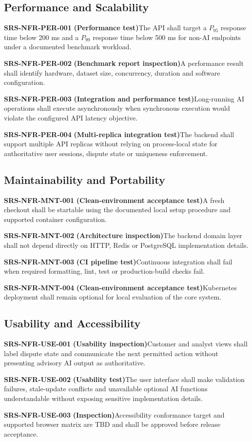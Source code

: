 \documentclass[11pt,a4paper]{article}
\newcommand{\req}[3]{%
    \par\noindent\textbf{\color{ADGBlue}#1}\quad
    \textbf{(#3)}\enspace #2\par\smallskip
}
\begin{document}
\subsection{Performance and Scalability}

\req{SRS-NFR-PER-001}{The API shall target a \(P_{95}\) response time below 200 ms and a \(P_{99}\) response time below 500 ms for non-AI endpoints under a documented benchmark workload.}{Performance test}
\req{SRS-NFR-PER-002}{A performance result shall identify hardware, dataset size, concurrency, duration and software configuration.}{Benchmark report inspection}
\req{SRS-NFR-PER-003}{Long-running AI operations shall execute asynchronously when synchronous execution would violate the configured API latency objective.}{Integration and performance test}
\req{SRS-NFR-PER-004}{The backend shall support multiple API replicas without relying on process-local state for authoritative user sessions, dispute state or uniqueness enforcement.}{Multi-replica integration test}

\subsection{Maintainability and Portability}

\req{SRS-NFR-MNT-001}{A fresh checkout shall be startable using the documented local setup procedure and supported container configuration.}{Clean-environment acceptance test}
\req{SRS-NFR-MNT-002}{The backend domain layer shall not depend directly on HTTP, Redis or PostgreSQL implementation details.}{Architecture inspection}
\req{SRS-NFR-MNT-003}{Continuous integration shall fail when required formatting, lint, test or production-build checks fail.}{CI pipeline test}
\req{SRS-NFR-MNT-004}{Kubernetes deployment shall remain optional for local evaluation of the core system.}{Clean-environment acceptance test}

\subsection{Usability and Accessibility}

\req{SRS-NFR-USE-001}{Customer and analyst views shall label dispute state and communicate the next permitted action without presenting advisory AI output as authoritative.}{Usability inspection}
\req{SRS-NFR-USE-002}{The user interface shall make validation failures, stale-update conflicts and unavailable optional AI functions understandable without exposing sensitive implementation details.}{Usability test}
\req{SRS-NFR-USE-003}{Accessibility conformance target and supported browser matrix are TBD and shall be approved before release acceptance.}{Inspection}
\end{document}
